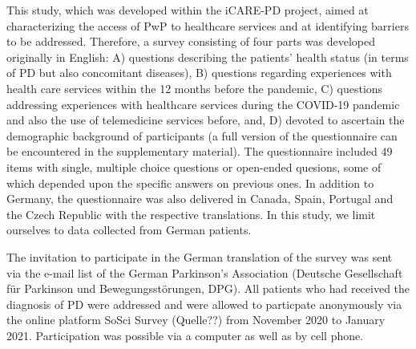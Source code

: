 \documentclass{bmcart}
\begin{document}
This study, which was developed within the iCARE-PD project, aimed at characterizing the access of PwP to healthcare services and at identifying barriers to be addressed. Therefore, a survey consisting of four parts was developed originally in English: A) questions describing the patients' health status (in terms of PD but also concomitant diseases), B) questions regarding experiences with health care services within the 12 months before the pandemic, C) questions addressing experiences with healthcare services during the COVID-19 pandemic and also the use of telemedicine services before, and, D) devoted to ascertain the demographic background of participants (a full version of the questionnaire can be encountered in the supplementary material). The questionnaire included 49 items with single, multiple choice questions or open-ended quesions, some of which depended upon the specific answers on previous ones. In addition to Germany, the questionnaire was also delivered in Canada, Spain, Portugal and the Czech Republic with the respective translations. In this study, we limit ourselves to data collected from German patients.

The invitation to participate in the German translation of the survey was sent via the e-mail list of the German Parkinson's Association (Deutsche Gesellschaft für Parkinson und Bewegungsstörungen, DPG). All patients who had received the diagnosis of PD were addressed and were allowed to particpate anonymously via the online platform SoSci Survey (Quelle??) from November 2020 to January 2021. Participation was possible via a computer as well as by cell phone. %

\end{document}
